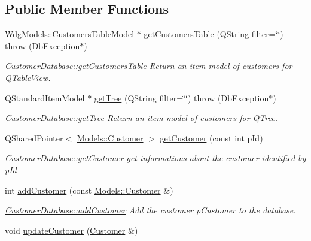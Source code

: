 \subsection*{Public Member Functions}
\begin{DoxyCompactItemize}
\item 
\hyperlink{classGui_1_1Widgets_1_1WdgModels_1_1CustomersTableModel}{Wdg\+Models\+::\+Customers\+Table\+Model} $\ast$ \hyperlink{classDatabases_1_1CustomerDatabase_a9c7ab43d4e219710604e030eb8ab44d8}{get\+Customers\+Table} (Q\+String filter=\char`\"{}\char`\"{})  throw (\+Db\+Exception$\ast$)
\begin{DoxyCompactList}\small\item\em \hyperlink{classDatabases_1_1CustomerDatabase_a9c7ab43d4e219710604e030eb8ab44d8}{Customer\+Database\+::get\+Customers\+Table} Return an item model of customers for Q\+Table\+View. \end{DoxyCompactList}\item 
Q\+Standard\+Item\+Model $\ast$ \hyperlink{classDatabases_1_1CustomerDatabase_ac611950b0502fbfe129ee1d1b495def4}{get\+Tree} (Q\+String filter=\char`\"{}\char`\"{})  throw (\+Db\+Exception$\ast$)
\begin{DoxyCompactList}\small\item\em \hyperlink{classDatabases_1_1CustomerDatabase_ac611950b0502fbfe129ee1d1b495def4}{Customer\+Database\+::get\+Tree} Return an item model of customers for Q\+Tree. \end{DoxyCompactList}\item 
Q\+Shared\+Pointer$<$ \hyperlink{classModels_1_1Customer}{Models\+::\+Customer} $>$ \hyperlink{classDatabases_1_1CustomerDatabase_ab0544439382fb6891cd7d27f67cb120c}{get\+Customer} (const int p\+Id)
\begin{DoxyCompactList}\small\item\em \hyperlink{classDatabases_1_1CustomerDatabase_ab0544439382fb6891cd7d27f67cb120c}{Customer\+Database\+::get\+Customer} get informations about the customer identified by {\itshape p\+Id} \end{DoxyCompactList}\item 
int \hyperlink{classDatabases_1_1CustomerDatabase_a0f45861747bcb0eef12f432dfe9be30e}{add\+Customer} (const \hyperlink{classModels_1_1Customer}{Models\+::\+Customer} \&)
\begin{DoxyCompactList}\small\item\em \hyperlink{classDatabases_1_1CustomerDatabase_a0f45861747bcb0eef12f432dfe9be30e}{Customer\+Database\+::add\+Customer} Add the customer {\itshape p\+Customer} to the database. \end{DoxyCompactList}\item 
\hypertarget{classDatabases_1_1CustomerDatabase_a83493698214a2e8e68024d007e715f35}{}void \hyperlink{classDatabases_1_1CustomerDatabase_a83493698214a2e8e68024d007e715f35}{update\+Customer} (\hyperlink{classModels_1_1Customer}{Customer} \&)\label{classDatabases_1_1CustomerDatabase_a83493698214a2e8e68024d007e715f35}


\end{DoxyCompactItemize}

